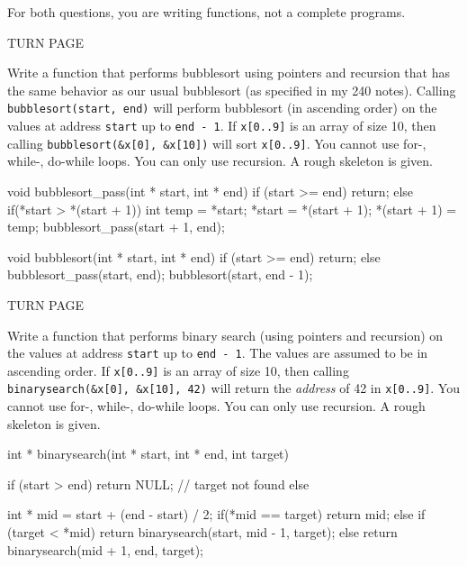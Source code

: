 

For both questions, you are writing functions, not a complete programs.

TURN PAGE

\newpage
\nextq
Write a function that performs bubblesort using pointers and recursion
that has the same behavior as our usual bubblesort
(as specified in my 240 notes).
Calling \verb!bubblesort(start, end)! will perform bubblesort (in ascending
order) on the values at address \verb!start! up to \verb!end - 1!.
If \verb!x[0..9]! is an array of size 10, then calling
\verb!bubblesort(&x[0], &x[10])! will sort \verb!x[0..9]!.
You cannot use for-, while-, do-while loops.
You can only use recursion.
A rough skeleton is given.

\ANSWER
\begin{answercode}
void bubblesort_pass(int * start, int * end)
{
    if (start >= end)
    {
        return;
    }
    else
    {
      if(*start > *(start + 1))
      {
        int temp = *start;
        *start = *(start + 1);
        *(start + 1) = temp;
      }
        bubblesort_pass(start + 1, end);
    }
}

void bubblesort(int * start, int * end)
{
    if (start >= end)
    {
        return;
    }
    else
    {
        bubblesort_pass(start, end);
        bubblesort(start, end - 1);
    }
}
\end{answercode}

TURN PAGE

\newpage
\nextq
Write a function that performs binary search (using pointers and recursion)
on the values at address \verb!start! up to \verb!end - 1!.
The values are assumed to be in ascending order.
If \verb!x[0..9]! is an array of size 10, then calling
\verb!binarysearch(&x[0], &x[10], 42)! will return the \textit{address} of 42
in \verb!x[0..9]!.
You cannot use for-, while-, do-while loops.
You can only use recursion.
A rough skeleton is given.

\ANSWER
\begin{answercode}
int * binarysearch(int * start, int * end, int target)
{
    if (start > end)
    {
        return NULL; // target not found
    }
    else
    {
      int * mid = start + (end - start) / 2;
      if(*mid == target)
        return mid;
      else if (target < *mid)
        return binarysearch(start, mid - 1, target);
      else
        return binarysearch(mid + 1, end, target);
        
    }
}
\end{answercode}


